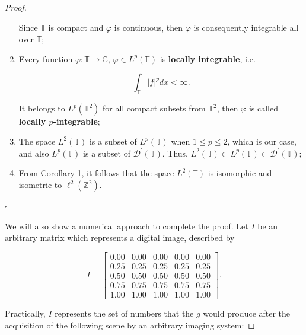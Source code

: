 \begin{theorem}{3}
\begin{proof}
\begin{enumerate}[label=(\roman*)]
     Since $\mathbb{T}$ is compact and $\varphi$ is continuous, then $\varphi$ is consequently integrable all over $\mathbb{T}$;
     
     \item Every function $\varphi : \mathbb{T} \rightarrow \mathbb{C}$, $\varphi \in L^{p}(\mathbb{T})$ is \textbf{locally integrable}, i.e.
     
     \[ \int_{\mathbb{T}} |f|^{p}dx < \infty. \]
     
     It belongs to $L^{p}(\mathbb{T}^{2})$ for all compact subsets from $\mathbb{T}^{2}$, then $\varphi$ is called \textbf{locally $p$-integrable};
     
     \item The space $L^{2}(\mathbb{T})$ is a subset of $L^{p}(\mathbb{T})$ when $1 \leq p \leq 2$, which is our case, and also $L^{p}(\mathbb{T})$ is a subset of $\mathcal{D}^{'}(\mathbb{T})$. Thus, $L^{2}(\mathbb{T}) \subset L^{p}(\mathbb{T}) \subset \mathcal{D}^{'}(\mathbb{T})$; 
     
     \item From Corollary 1, it follows that the space $L^{2}(\mathbb{T})$ is isomorphic and isometric to $\ell^{2}(\mathbb{Z}^{2})$.
\end{enumerate}

\begin{flushright}
$\square$
\end{flushright}

\noindent We will also show a numerical approach to complete the proof. Let $I$ be an arbitrary matrix which represents a digital image, described by

\[
I = 
\begin{bmatrix}
    0.00 & 0.00 & 0.00 & 0.00 & 0.00
    \\
    0.25 & 0.25 & 0.25 & 0.25 & 0.25
    \\
    0.50 & 0.50 & 0.50 & 0.50 & 0.50
    \\
    0.75 & 0.75 & 0.75 & 0.75 & 0.75
    \\
    1.00 & 1.00 & 1.00 & 1.00 & 1.00
\end{bmatrix}.
\]

\noindent Practically, $I$ represents the set of numbers that the $g$ would produce after the acquisition of the following scene by an arbitrary imaging system:


\end{proof}
\end{theorem}
